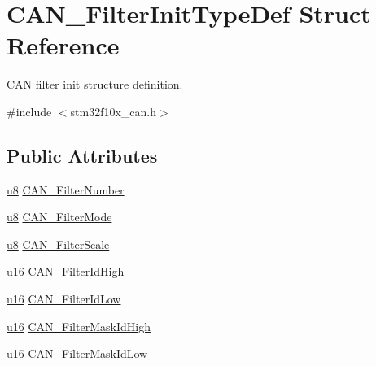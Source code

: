 \hypertarget{struct_c_a_n___filter_init_type_def}{}\section{C\+A\+N\+\_\+\+Filter\+Init\+Type\+Def Struct Reference}
\label{struct_c_a_n___filter_init_type_def}


C\+AN filter init structure definition.  




{\ttfamily \#include $<$stm32f10x\+\_\+can.\+h$>$}

\subsection*{Public Attributes}
\begin{DoxyCompactItemize}
\item 
\hyperlink{agilefox_2library_2inc_2stm32f10x__type_8h_aed742c436da53c1080638ce6ef7d13de}{u8} \hyperlink{struct_c_a_n___filter_init_type_def_a5d757a1b31fccf8fa16a8d588c21fddb}{C\+A\+N\+\_\+\+Filter\+Number}
\item 
\hyperlink{agilefox_2library_2inc_2stm32f10x__type_8h_aed742c436da53c1080638ce6ef7d13de}{u8} \hyperlink{struct_c_a_n___filter_init_type_def_aa1abe2377ba735507df0b1597acedbd9}{C\+A\+N\+\_\+\+Filter\+Mode}
\item 
\hyperlink{agilefox_2library_2inc_2stm32f10x__type_8h_aed742c436da53c1080638ce6ef7d13de}{u8} \hyperlink{struct_c_a_n___filter_init_type_def_a84cad6632627c90a33bbfd4e8a7689bf}{C\+A\+N\+\_\+\+Filter\+Scale}
\item 
\hyperlink{agilefox_2library_2inc_2stm32f10x__type_8h_a9e6c91d77e24643b888dbd1a1a590054}{u16} \hyperlink{struct_c_a_n___filter_init_type_def_a04335637e20073aa50961a5352d6b38c}{C\+A\+N\+\_\+\+Filter\+Id\+High}
\item 
\hyperlink{agilefox_2library_2inc_2stm32f10x__type_8h_a9e6c91d77e24643b888dbd1a1a590054}{u16} \hyperlink{struct_c_a_n___filter_init_type_def_a1f0928f446f1a67acaad4244dc737330}{C\+A\+N\+\_\+\+Filter\+Id\+Low}
\item 
\hyperlink{agilefox_2library_2inc_2stm32f10x__type_8h_a9e6c91d77e24643b888dbd1a1a590054}{u16} \hyperlink{struct_c_a_n___filter_init_type_def_a10d78971c14d79c43d11ee0acf591796}{C\+A\+N\+\_\+\+Filter\+Mask\+Id\+High}
\item 
\hyperlink{agilefox_2library_2inc_2stm32f10x__type_8h_a9e6c91d77e24643b888dbd1a1a590054}{u16} \hyperlink{struct_c_a_n___filter_init_type_def_a275d901d0e4aeb5c1a5c3fea976f9b0c}{C\+A\+N\+\_\+\+Filter\+Mask\+Id\+Low}

\end{DoxyCompactItemize}
